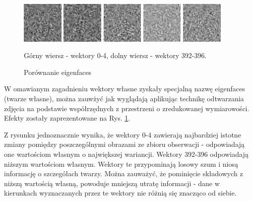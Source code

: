 \documentclass[oneside, eng]{mgr}
\begin{document}
\begin{figure}
	\begin{minipage}{2cm}
		\includegraphics[width=2cm]{392.jpg}
	\end{minipage}
	\begin{minipage}{2cm}
		\includegraphics[width=2cm]{393.jpg}
	\end{minipage}
	\begin{minipage}{2cm}
		\includegraphics[width=2cm]{394.jpg}
	\end{minipage}
	\begin{minipage}{2cm}
		\includegraphics[width=2cm]{395.jpg}
	\end{minipage}
	\begin{minipage}{2cm}
		\includegraphics[width=2cm]{396.jpg}
	\end{minipage}
	\caption{Porównanie eigenfaces}
Górny wiersz - wektory 0-4, dolny wiersz - wektory 392-396.
	\label{fig:eigenfaces}
\end{figure}

W omawianym zagadnieniu wektory własne zyskały specjalną nazwę eigenfaces (twarze własne), można zauwżyć jak wyglądają aplikując technikę odtwarzania zdjęcia na podstawie współrzędnych z przestrzeni o zredukowanej wymiarowości. Efekty zostały zaprezentowane na Rys. \ref{fig:eigenfaces}. 

Z rysunku jednoznacznie wynika, że wektory 0-4 zawierają najbardziej istotne zmiany pomiędzy poszczególnymi obrazami ze zbioru obserwacji - odpowiadają one wartościom własnym o największej wariancji. Wektory 392-396 odpowiadają niższym wartościom własnym. Wektory te przypominają losowy szum i niosą informację o szczegółach twarzy. Można zauważyć, że pominięcie składowych z niższą wartością własną, powoduje mniejszą utratę informacji - dane w kierunkach wyznaczanych przez te wektory nie różnią się znacząco od siebie.
\end{document}
